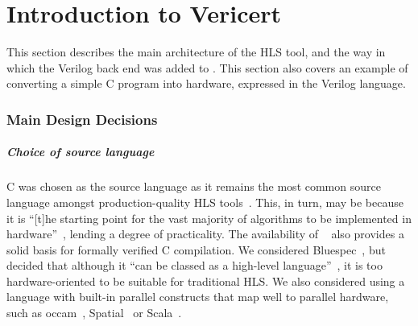 \chapter{Introduction to Vericert}

This section describes the main architecture of the HLS tool, and the way in which the Verilog back end was added to \compcert{}.  This section also covers an example of converting a simple C program into hardware, expressed in the Verilog language.

\subsection{Main Design Decisions}

\paragraph{Choice of source language}
C was chosen as the source language as it remains the most common source language amongst production-quality HLS tools~\cite{canis11_legup, xilinx20_vivad_high_synth, intel_hls, bambu_hls}. This, in turn, may be because it is ``[t]he starting point for the vast majority of algorithms to be implemented in hardware''~\cite{5522874}, lending a degree of practicality.
The availability of \compcert{}~\cite{leroy09_formal_verif_realis_compil} also provides a solid basis for formally verified C compilation.
We considered Bluespec~\cite{nikhil04_blues_system_veril}, but decided that although it ``can be classed as a high-level language''~\cite{greaves_note}, it is too hardware-oriented to be suitable for traditional HLS.
We also considered using a language with built-in parallel constructs that map well to parallel hardware, such as occam~\cite{page91_compil_occam}, Spatial~\cite{spatial} or Scala~\cite{chisel}.


